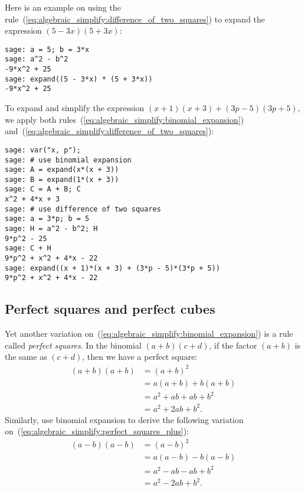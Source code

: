 Here is an example on using the
rule~(\ref{eq:algebraic_simplify:difference_of_two_squares}) to expand
the expression $(5 - 3x)(5 + 3x)$:
%
\begin{lstlisting}
sage: a = 5; b = 3*x
sage: a^2 - b^2
-9*x^2 + 25
sage: expand((5 - 3*x) * (5 + 3*x))
-9*x^2 + 25
\end{lstlisting}

To expand and simplify the expression
$(x + 1)(x + 3) + (3p - 5)(3p + 5)$, we apply both
rules~(\ref{eq:algebraic_simplify:binomial_expansion})
and~(\ref{eq:algebraic_simplify:difference_of_two_squares}):

\begin{lstlisting}
sage: var("x, p");
sage: # use binomial expansion
sage: A = expand(x*(x + 3))
sage: B = expand(1*(x + 3))
sage: C = A + B; C
x^2 + 4*x + 3
sage: # use difference of two squares
sage: a = 3*p; b = 5
sage: H = a^2 - b^2; H
9*p^2 - 25
sage: C + H
9*p^2 + x^2 + 4*x - 22
sage: expand((x + 1)*(x + 3) + (3*p - 5)*(3*p + 5))
9*p^2 + x^2 + 4*x - 22
\end{lstlisting}



\subsection{Perfect squares and perfect cubes}

Yet another variation on~(\ref{eq:algebraic_simplify:binomial_expansion})
is a rule called \emph{perfect squares}. In the
binomial $(a + b)(c + d)$, if the factor $(a + b)$ is the same as
$(c + d)$, then we have a perfect square:
%
\begin{equation}
\label{eq:algebraic_simplify:perfect_squares_plus}
\begin{aligned}
(a + b) (a + b)
&=
(a + b)^2 \\
&=
a(a + b) + b(a + b) \\
&=
a^2 + ab + ab + b^2 \\
&=
a^2 + 2ab + b^2.
\end{aligned}
\end{equation}
%
Similarly, use binomial expansion to derive the following variation
on~(\ref{eq:algebraic_simplify:perfect_squares_plus}):
%
\begin{equation}
\label{eq:algebraic_simplify:perfect_squares_minus}
\begin{aligned}
(a - b) (a - b)
&=
(a - b)^2 \\
&=
a(a - b) - b(a - b) \\
&=
a^2 - ab - ab + b^2 \\
&=
a^2 - 2ab + b^2.
\end{aligned}
\end{equation}

